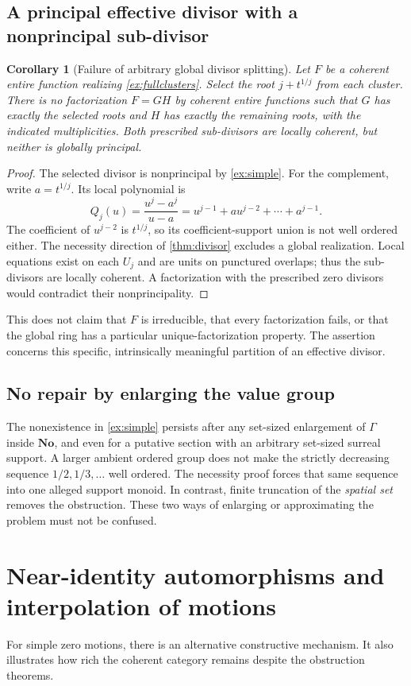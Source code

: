 \documentclass[11pt,letterpaper]{article}
\newtheorem{corollary}[corollary]{Corollary}
\theoremstyle{definition}
\theoremstyle{remark}
\newcommand{\No}{\mathbf{No}}
\numberwithin{equation}{section}
\begin{document}
\subsection{A principal effective divisor with a nonprincipal sub-divisor}
\begin{corollary}[Failure of arbitrary global divisor splitting]\label{cor:splitting}
Let $F$ be a coherent entire function realizing \cref{ex:fullclusters}. Select the root $j+t^{1/j}$ from each cluster. There is no factorization $F=GH$ by coherent entire functions such that $G$ has exactly the selected roots and $H$ has exactly the remaining roots, with the indicated multiplicities. Both prescribed sub-divisors are locally coherent, but neither is globally principal.
\end{corollary}
\begin{proof}
The selected divisor is nonprincipal by \cref{ex:simple}. For the complement, write $a=t^{1/j}$. Its local polynomial is
\[
 Q_j(u)=\frac{u^j-a^j}{u-a}
 =u^{j-1}+a u^{j-2}+\cdots+a^{j-1}.
\]
The coefficient of $u^{j-2}$ is $t^{1/j}$, so its coefficient-support union is not well ordered either. The necessity direction of \cref{thm:divisor} excludes a global realization. Local equations exist on each $U_j$ and are units on punctured overlaps; thus the sub-divisors are locally coherent. A factorization with the prescribed zero divisors would contradict their nonprincipality.
\end{proof}
This does not claim that $F$ is irreducible, that every factorization fails, or that the global ring has a particular unique-factorization property. The assertion concerns this specific, intrinsically meaningful partition of an effective divisor.

\subsection{No repair by enlarging the value group}
The nonexistence in \cref{ex:simple} persists after any set-sized enlargement of $\Gamma$ inside $\No$, and even for a putative section with an arbitrary set-sized surreal support. A larger ambient ordered group does not make the strictly decreasing sequence $1/2,1/3,\ldots$ well ordered. The necessity proof forces that same sequence into one alleged support monoid. In contrast, finite truncation of the \emph{spatial set} removes the obstruction. These two ways of enlarging or approximating the problem must not be confused.

\section{Near-identity automorphisms and interpolation of motions}\label{sec:automorphisms}
For simple zero motions, there is an alternative constructive mechanism. It also illustrates how rich the coherent category remains despite the obstruction theorems.
\end{document}

